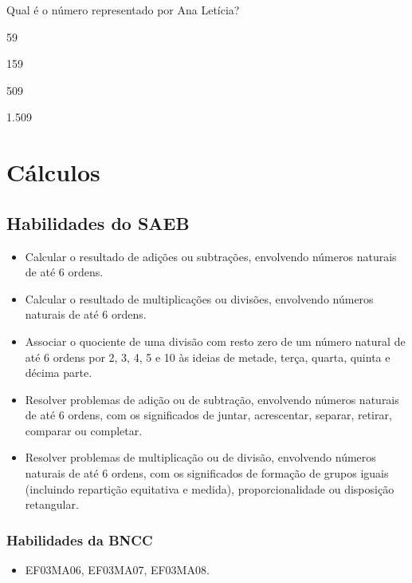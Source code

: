 Qual é o número representado por Ana Letícia? 

\begin{escolha}
\item
  59
\item
  159
\item
  509
\item
  1.509
\end{escolha}
\pagebreak

\chapter{Cálculos}

\section*{Habilidades do SAEB}

\begin{itemize}
\item Calcular o resultado de adições ou subtrações, envolvendo números
naturais de até 6 ordens.

\item Calcular o resultado de multiplicações ou divisões, envolvendo números
naturais de até 6 ordens.

\item Associar o quociente de uma divisão com resto zero de um número
natural de até 6 ordens por 2, 3, 4, 5 e 10 às ideias de metade, terça,
quarta, quinta e décima parte.

\item Resolver problemas de adição ou de subtração, envolvendo números
naturais de até 6 ordens, com os significados de juntar, acrescentar,
separar, retirar, comparar ou completar.

\item Resolver problemas de multiplicação ou de divisão, envolvendo números
naturais de até 6 ordens, com os significados de formação de grupos
iguais (incluindo repartição equitativa e medida), proporcionalidade ou
disposição retangular.
\end{itemize}

\subsection{Habilidades da BNCC}

\begin{itemize}
\item EF03MA06, EF03MA07, EF03MA08.
\end{itemize}

